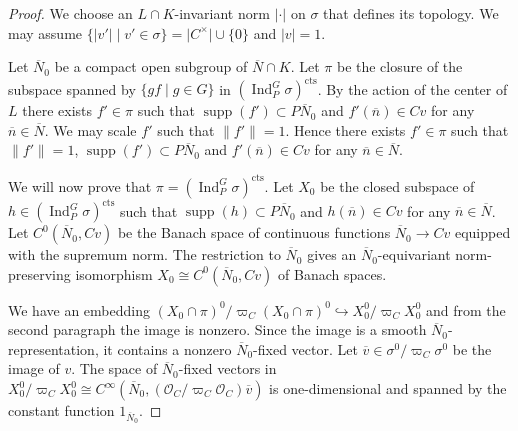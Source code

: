 \documentclass[a4paper]{amsart}
\numberwithin{equation}{section}
\theoremstyle{remark}
\theoremstyle{definition}
\DeclareMathOperator{\Ind}{Ind}
\DeclareMathOperator{\supp}{supp}
\newcommand{\cts}{\mathrm{cts}}
\renewcommand{\simeq}{\cong}
\begin{document}
\begin{proof}
We choose an $L\cap K$-invariant norm $\lvert \cdot \rvert$ on $\sigma$ that defines its topology.
We may assume $\{\lvert v'\rvert\mid v'\in \sigma\} = \lvert C^{\times}\rvert\cup \{0\}$ and $\lvert v\rvert = 1$.

Let $\overline{N}_{0}$ be a compact open subgroup of $\overline{N}\cap K$.
Let $\pi$ be the closure of the subspace spanned by $\{gf\mid g\in G\}$ in $(\Ind_{P}^{G}\sigma)^{\cts}$.
By the action of the center of $L$ there exists $f'\in \pi$ such that $\supp(f')\subset P\overline{N}_{0}$ and $f'(\overline{n})\in Cv$ for any $\overline{n}\in \overline{N}$.
We may scale $f'$ such that $\lVert f'\rVert = 1$.
Hence there exists $f'\in \pi$ such that $\lVert f'\rVert = 1$, $\supp(f')\subset P\overline{N}_{0}$ and $f'(\overline{n})\in Cv$ for any $\overline{n}\in \overline{N}$.

We will now prove that $\pi = (\Ind_{P}^{G}\sigma)^{\cts}$.
Let $X_{0}$ be the closed subspace of $h\in (\Ind_{P}^{G}\sigma)^{\cts}$ such that $\supp(h)\subset P\overline{N}_{0}$ and $h(\overline{n})\in Cv$ for any $\overline{n}\in \overline{N}$.
Let $C^{0}(\overline{N}_{0},Cv)$ be the Banach space of continuous functions $\overline{N}_{0}\to Cv$ equipped with the supremum norm.
The restriction to $\overline{N}_{0}$ gives an $\overline{N}_{0}$-equivariant norm-preserving isomorphism $X_{0}\simeq C^{0}(\overline{N}_{0},Cv)$ of Banach spaces.

We have an embedding $(X_{0}\cap \pi)^{0}/\varpi_{C}(X_{0}\cap \pi)^{0}\hookrightarrow X_{0}^{0}/\varpi_{C}X_{0}^{0}$ and from the second paragraph the image is nonzero.
Since the image is a smooth $\overline{N}_{0}$-representation, it contains a nonzero $\overline{N}_{0}$-fixed vector.
Let $\overline{v}\in \sigma^{0}/\varpi_{C}\sigma^{0}$ be the image of $v$.
The space of $\overline{N}_{0}$-fixed vectors in $X_{0}^{0}/\varpi_{C}X_{0}^{0}\simeq C^{\infty}(\overline{N}_{0},(\mathcal{O}_{C}/\varpi_{C}\mathcal{O}_{C})\overline{v})$ is one-dimensional and spanned by the constant function $1_{\overline{N}_{0}}$.


\end{proof}
\end{document}

